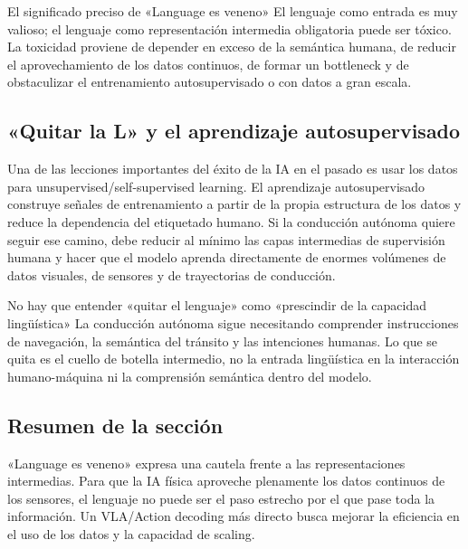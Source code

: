 \begin{importantbox}{El significado preciso de «Language es veneno»}
El lenguaje como entrada es muy valioso; el lenguaje como representación intermedia obligatoria puede ser tóxico. La toxicidad proviene de depender en exceso de la semántica humana, de reducir el aprovechamiento de los datos continuos, de formar un bottleneck y de obstaculizar el entrenamiento autosupervisado o con datos a gran escala.
\end{importantbox}

\subsection{«Quitar la L» y el aprendizaje autosupervisado}

Una de las lecciones importantes del éxito de la IA en el pasado es usar los datos para unsupervised/self-supervised learning. El aprendizaje autosupervisado construye señales de entrenamiento a partir de la propia estructura de los datos y reduce la dependencia del etiquetado humano. Si la conducción autónoma quiere seguir ese camino, debe reducir al mínimo las capas intermedias de supervisión humana y hacer que el modelo aprenda directamente de enormes volúmenes de datos visuales, de sensores y de trayectorias de conducción.

\begin{warningbox}{No hay que entender «quitar el lenguaje» como «prescindir de la capacidad lingüística»}
La conducción autónoma sigue necesitando comprender instrucciones de navegación, la semántica del tránsito y las intenciones humanas. Lo que se quita es el cuello de botella intermedio, no la entrada lingüística en la interacción humano-máquina ni la comprensión semántica dentro del modelo.
\end{warningbox}

\subsection{Resumen de la sección}

«Language es veneno» expresa una cautela frente a las representaciones intermedias. Para que la IA física aproveche plenamente los datos continuos de los sensores, el lenguaje no puede ser el paso estrecho por el que pase toda la información. Un VLA/Action decoding más directo busca mejorar la eficiencia en el uso de los datos y la capacidad de scaling.
